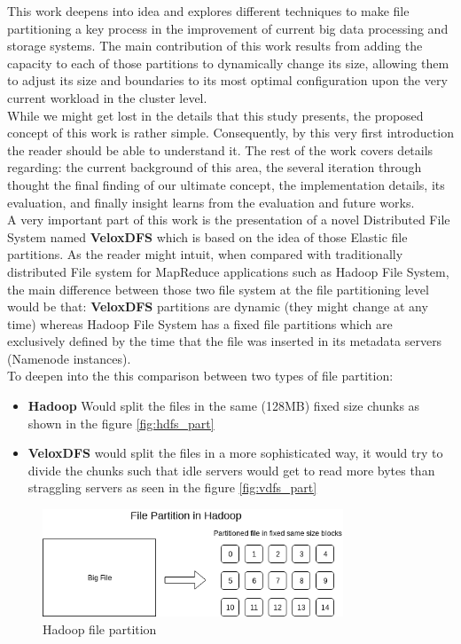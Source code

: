 This work deepens into idea and explores different techniques to make
file partitioning a key process in the improvement of current big data
processing and storage systems. The main contribution of this work results from
adding the capacity to each of those partitions to dynamically change its size,
allowing them to adjust its size and boundaries to its most optimal
configuration upon the very current workload in the cluster level.  \\

While we might get lost in the details that this study presents, the proposed
concept of this work is rather simple. Consequently, by this very first
introduction the reader should be able to understand it. The rest of the work
covers details regarding: the current background of this area, the several
iteration through thought the final finding of our ultimate concept, the
implementation details, its evaluation, and finally insight learns from the
evaluation and future works.  \\

A very important part of this work is the presentation of a novel Distributed
File System named \textbf{VeloxDFS} which is based on the idea of those Elastic file
partitions. As the reader might intuit, when compared with traditionally
distributed File system for MapReduce applications such as Hadoop File System,
the main difference between those two file system at the file partitioning level
would be that: \textbf{VeloxDFS} partitions are dynamic (they might change at any time)
whereas Hadoop File System has a fixed file partitions which are exclusively
defined by the time that the file was inserted in its metadata servers (Namenode
instances).  \\

To deepen into the this comparison between two types of file partition:
\begin{itemize}
    \item \textbf{Hadoop} Would split the files in the same (128MB) fixed size chunks
          as shown in the figure \ref{fig:hdfs_part}
          
    \item \textbf{VeloxDFS} would split the files in a more sophisticated way, it would try
        to divide the chunks such that idle servers would get to read more bytes than straggling servers
        as seen in the figure \ref{fig:vdfs_part}
\end{itemize}


\label{fig:hdfs_part}
\begin{figure}[H]
    \centering
    \includegraphics[width=0.8\textwidth]{figures/hadoop_partition.png}
    \caption{Hadoop file partition}
\end{figure}

